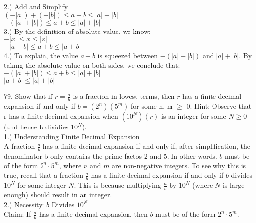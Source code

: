 \documentclass{article}
\begin{document}
2.) Add and Simplify\\
\indent$(-\left|a\right|)+(-\left| b\right|) \leq a + b \leq \left|a\right| + \left|b\right|$\\
\indent$-(\left|a\right| + \left|b\right|) \leq a + b \leq \left|a\right| + \left|b\right|$\\

3.) By the definition of absolute value, we know:\\
\indent$-\left|x\right| \leq x \leq \left|x\right|$\\
\indent$-\left|a+b\right| \leq a+b \leq \left|a+b\right|$\\

4.) To explain, the value $a + b$ is squeezed between $-(\left|a\right| + \left|b\right|)$ and $\left|a\right| + \left|b\right|$. By taking the absolute value on both sides, we conclude that: \\
\indent$-(\left|a\right| + \left|b\right|) \leq a + b \leq \left|a\right| + \left|b\right|$\\
\indent$\left|a + b\right| \leq \left|a\right| + \left|b\right|$\\

\newpage

79. Show that if $r=\frac{a}{b}$ is a fraction in lowest terms, then $r$ has a finite decimal expansion if and only if $b = (2^n)(5^m)$ for some n, m $\geq$ 0. Hint: Observe that r has a finite decimal expansion when $(10^N)(r)$ is an integer for some $N\geq0$ (and hence b dividies $10^N$).\\

1.) Understanding Finite Decimal Expansion\\

A fraction $\frac{a}{b}$ has a finite decimal expansion if and only if, after simplification, the denominator b only contains the prime factos 2 and 5. In other words, $b$ must be of the form $2^n \cdot 5^m$, where $n$ and $m$ are non-negative integers. To see why this is true, recall that a fraction $\frac{a}{b}$ has a finite decimal expansion if and only if $b$ divides $10^N$ for some integer $N$. This is because multiplying $\frac{a}{b}$ by $10^N$ (where $N$ is large enough) should result in an integer.\\

2.) Necessity: $b$ Divides $10^N$\\

Claim: If $\frac{a}{b}$ has a finite decimal expansion, then $b$ must be of the form $2^n \cdot 5^m$.\\
\end{document}
